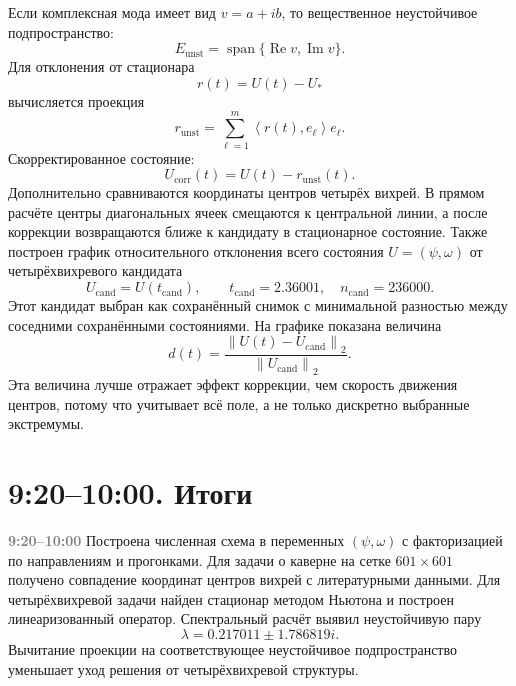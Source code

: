 \documentclass[12pt,a4paper]{article}
\newcommand{\norm}[1]{\left\lVert #1 \right\rVert}
\newcommand{\inner}[2]{\left\langle #1,#2 \right\rangle}
\newcommand{\timing}[1]{\noindent\textcolor{gray}{\textbf{#1}}\quad}
\newcommand{\slide}[1]{%
    \par\noindent
    \fbox{\begin{minipage}{0.96\textwidth}
    \textbf{Слайд:} #1
    \end{minipage}}
    \par
}
\begin{document}
Если комплексная мода имеет вид \(v=a+ib\), то вещественное неустойчивое подпространство:
\[
    E_{\mathrm{unst}}
    =
    \operatorname{span}\{\operatorname{Re}v,\operatorname{Im}v\}.
\]
Для отклонения от стационара
\[
    r(t)=U(t)-U_*
\]
вычисляется проекция
\[
    r_{\mathrm{unst}}
    =
    \sum_{\ell=1}^{m}
    \inner{r(t)}{e_\ell}e_\ell.
\]
Скорректированное состояние:
\[
    U_{\mathrm{corr}}(t)=U(t)-r_{\mathrm{unst}}(t).
\]
Дополнительно сравниваются координаты центров четырёх вихрей.
В прямом расчёте центры диагональных ячеек смещаются к центральной линии, а после коррекции возвращаются ближе к кандидату в стационарное состояние.
Также построен график относительного отклонения всего состояния \(U=(\psi,\omega)\) от четырёхвихревого кандидата
\[
    U_{\mathrm{cand}}=U(t_{\mathrm{cand}}),
    \qquad
    t_{\mathrm{cand}}=2.36001,\quad n_{\mathrm{cand}}=236000.
\]
Этот кандидат выбран как сохранённый снимок с минимальной разностью между соседними сохранёнными состояниями.
На графике показана величина
\[
    d(t)=
    \frac{\norm{U(t)-U_{\mathrm{cand}}}_2}
         {\norm{U_{\mathrm{cand}}}_2}.
\]
Эта величина лучше отражает эффект коррекции, чем скорость движения центров, потому что учитывает всё поле, а не только дискретно выбранные экстремумы.

\section*{9:20--10:00. Итоги}

\slide{Итоговый слайд.}

\timing{9:20--10:00}
Построена численная схема в переменных \((\psi,\omega)\) с факторизацией по направлениям и прогонками.
Для задачи о каверне на сетке \(601\times601\) получено совпадение координат центров вихрей с литературными данными.
Для четырёхвихревой задачи найден стационар методом Ньютона и построен линеаризованный оператор.
Спектральный расчёт выявил неустойчивую пару
\[
    \lambda=0.217011\pm1.786819i.
\]
Вычитание проекции на соответствующее неустойчивое подпространство уменьшает уход решения от четырёхвихревой структуры.
\end{document}
